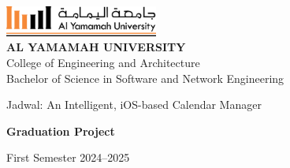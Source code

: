 \documentclass[12pt,a4paper]{report}
\begin{document}
\begin{singlespace}
    \begin{titlepage}
        \begin{center}
            \vspace*{1cm}
            \includegraphics[height=1cm]{images/yu-logo.png}\\[1cm]
            {\Large\bfseries AL YAMAMAH UNIVERSITY}\\[0.5cm]
            {\large College of Engineering and Architecture}\\[0.5cm]
            {\large Bachelor of Science in Software and Network Engineering}\\[2cm]
            {\Huge\bfseries
            \begin{spacing}{1}
                Jadwal: An Intelligent, iOS-based Calendar Manager
            \end{spacing}
            }
            \vspace{2cm}
            {\Large\bfseries Graduation Project}\\[2cm]
            \begin{center}
                \setlength{\fboxsep}{10pt}
                \setlength{\fboxrule}{1pt}
            \end{center}
            \vfill
            {\large First Semester 2024--2025}
        \end{center}
    \end{titlepage}
\end{singlespace}
\end{document}
